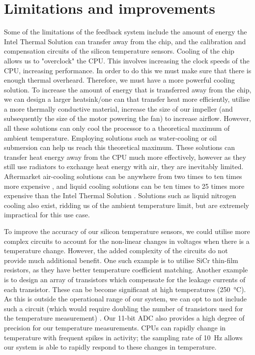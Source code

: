 \documentclass[conference]{IEEEtran}
\begin{document}
\section{Limitations and improvements}
Some of the limitations of the feedback system include the amount of energy the Intel Thermal Solution can transfer away from the chip, and the calibration and compensation circuits of the silicon temperature sensors. Cooling of the chip allows us to "overclock" the CPU. This involves increasing the clock speeds of the CPU, increasing performance. In order to do this we must make sure that there is enough thermal overheard. Therefore, we must have a more powerful cooling solution. To increase the amount of energy that is transferred away from the chip, we can design a larger heatsink/one can that transfer heat more efficiently, utilise a more thermally conductive material, increase the size of our impeller (and subsequently the size of the motor powering the fan) to increase airflow. However, all these solutions can only cool the processor to a theoretical maximum of ambient temperature. Employing solutions such as water-cooling or oil submersion can help us reach this theoretical maximum. These solutions can transfer heat energy away from the CPU much more effectively, however as they still use radiators to exchange heat energy with air, they are inevitably limited. Aftermarket air-cooling solutions can be anywhere from two times to ten times more expensive \cite{b14}, and liquid cooling solutions can be ten times to 25 times more expensive than the Intel Thermal Solution \cite{b15}. Solutions such as liquid nitrogen cooling also exist, ridding us of the ambient temperature limit, but are extremely impractical for this use case. 

To improve the accuracy of our silicon temperature sensors, we could utilise more complex circuits to account for the non-linear changes in voltages when there is a temperature change. However, the added complexity of the circuits do not provide much additional benefit. One such example is to utilise SiCr thin-film resistors, as they have better temperature coefficient matching. Another example is to design an array of transistors which compensate for the leakage currents of each transistor. These can be become significant at high temperatures (\SI{+250}{\celsius}). As this is outside the operational range of our system, we can opt to not include such a circuit (which would require doubling the number of transistors used for the temperature measurement) \cite{b8}. Our 11-bit ADC also provides a high degree of precision for our temperature measurements. CPUs can rapidly change in temperature with frequent spikes in activity; the sampling rate of \SI{10}{\hertz} allows our system is able to rapidly respond to these changes in temperature. 
\end{document}
